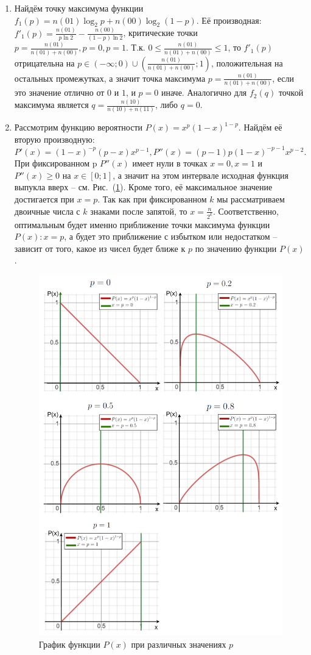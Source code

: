 \documentclass[12pt]{article}
\begin{document}
	\begin{enumerate}
	\item Найдём точку максимума функции $f_1(p) = n(01)\log_2{p} + n(00)\log_2{(1-p)}$. Её производная: $f'_1(p) = \frac{n(01)}{p\ln{2}} - \frac{n(00)}{(1-p)\ln{2}}$, критические точки $p=\frac{n(01)}{n(01)+n(00)},p=0,p=1$. Т.к. $0\le\frac{n(01)}{n(01)+n(00)}\le1$, то $f'_1(p)$ отрицательна на $p\in(-\infty;0)\cup\left(\frac{n(01)}{n(01)+n(00)};1\right)$, положительная на остальных промежутках, а значит точка максимума $p = \frac{n(01)}{n(01)+n(00)}$, если это значение отлично от $0$ и $1$, и $p=0$ иначе. Аналогично для $f_2(q)$ точкой максимума является $q=\frac{n(10)}{n(10)+n(11)}$, либо $q=0$.
	
	\item Рассмотрим функцию вероятности $P(x) = x^p(1-x)^{1-p}$. Найдём её вторую производную: $P'(x) = (1-x)^{-p} (p-x) x^{p-1}, P''(x)=(p-1) p (1-x)^{-p-1} x^{p-2}$. При фиксированном p $P''(x)$ имеет нули в точках $x=0, x=1$ и $P''(x)\ge0$ на $x\in[0;1]$, а значит на этом интервале исходная функция выпукла вверх -- см. Рис.~(\ref{pic:P(x,p)}). Кроме того, её максимальное значение достигается при $x=p$. Так как при фиксированном $k$ мы рассматриваем двоичные числа с $k$ знаками после запятой, то $x=\frac{n}{2^{k}}$. Соответственно, оптимальным будет именно приближение точки максимума функции $P(x): x = p$, а будет это приближение с избытком или недостатком -- зависит от того, какое из чисел будет ближе к $p$ по значению функции $P(x)$.
	
	\begin{figure}[h]
		\label{pic:P(x,p)}
		\centering
		\includegraphics[width=0.8\linewidth]{images/p(x,p).png}
		\caption{График функции $P(x)$ при различных значениях $p$}
	\end{figure}
	

\end{enumerate}
\end{document}
